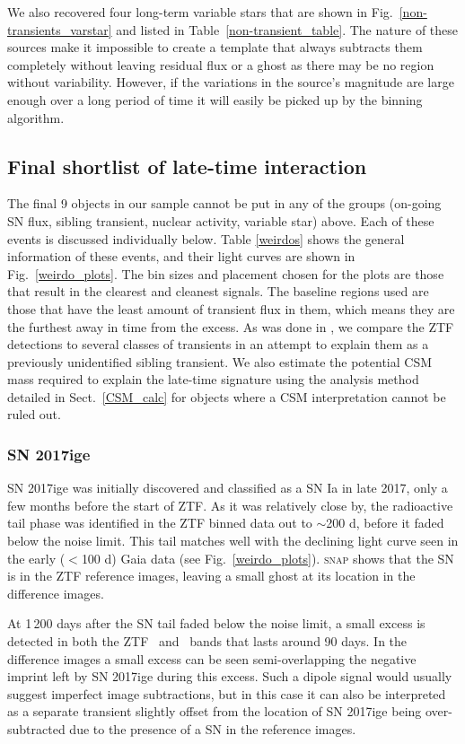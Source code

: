 \documentclass[a4paper,oneside,12pt, class=Latex/Classes/PhDthesisPSnPDF, crop=false]{standalone}
\begin{document}
We also recovered four long-term variable stars that are shown in Fig.~\ref{non-transients_varstar} and listed in Table~\ref{non-transient_table}. The nature of these sources make it impossible to create a template that always subtracts them completely without leaving residual flux or a ghost as there may be no region without variability. However, if the variations in the source's magnitude are large enough over a long period of time it will easily be picked up by the binning algorithm.


\subsection{Final shortlist of late-time interaction}
\label{weirdo_section}
The final 9 objects in our sample cannot be put in any of the groups (on-going SN flux, sibling transient, nuclear activity, variable star) above. Each of these events is discussed individually below. Table \ref{weirdos} shows the general information of these events, and their light curves are shown in Fig.~\ref{weirdo_plots}. The bin sizes and placement chosen for the plots are those that result in the clearest and cleanest signals. The baseline regions used are those that have the least amount of transient flux in them, which means they are the furthest away in time from the excess. As was done in \citet{Terwel_2024_paper1}, we compare the ZTF detections to several classes of transients in an attempt to explain them as a previously unidentified sibling transient. We also estimate the potential CSM mass required to explain the late-time signature using the analysis method detailed in Sect.~\ref{CSM_calc} for objects where a CSM interpretation cannot be ruled out.


\subsubsection*{SN 2017ige}
SN 2017ige was initially discovered and classified as a SN Ia in late 2017, only a few months before the start of ZTF. As it was relatively close by, the radioactive tail phase was identified in the ZTF binned data out to $\sim$200 d, before it faded below the noise limit. This tail matches well with the declining light curve seen in the early ($<$100 d) Gaia data (see Fig.~\ref{weirdo_plots}). \textsc{snap} shows that the SN is in the ZTF reference images, leaving a small ghost at its location in the difference images. 

At 1\,200 days after the SN tail faded below the noise limit, a small excess is detected in both the ZTF \ztfg~and \ztfr~bands that lasts around 90 days. In the difference images a small excess can be seen semi-overlapping the negative imprint left by SN 2017ige during this excess. Such a dipole signal would usually suggest imperfect image subtractions, but in this case it can also be interpreted as a separate transient slightly offset from the location of SN 2017ige being over-subtracted due to the presence of a SN in the reference images.
\end{document}

